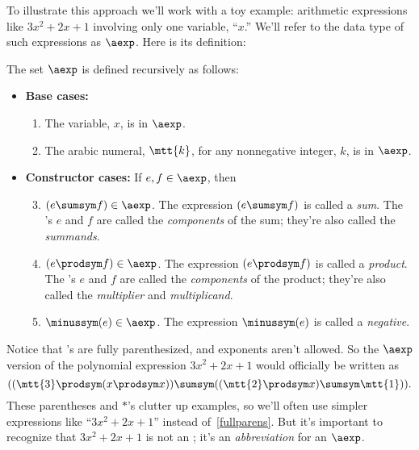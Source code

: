 To illustrate this approach we'll work with a toy example: arithmetic
expressions like $3x^2 + 2x + 1$ involving only one variable, ``$x$.''
We'll refer to the data type of such expressions as $\aexp$.  Here is its
definition:

\begin{definition}
The set $\aexp$ is defined recursively as follows:
\begin{itemize}
\item \textbf{Base cases:}

\begin{enumerate}

\item The variable, $x$, is in $\aexp$.

\item The arabic numeral, $\mtt{k}$, for any nonnegative integer, $k$, is
  in $\aexp$.

\end{enumerate}

\item \textbf{Constructor cases:} If $e,f \in \aexp$, then
\begin{enumerate}
\setcounter{enumi}{2}

\item $(e \sumsym f) \in \aexp$.  The expression $(e \sumsym f)$ is called a
  \emph{sum}.  The \aexp's $e$ and $f$ are called the \emph{components} of
  the sum; they're also called the \emph{summands}.

\item $(e \prodsym f) \in \aexp$.  The expression $(e \prodsym f)$ is called a
  \emph{product}.  The \aexp's $e$ and $f$ are called the
  \emph{components} of the product; they're also called the
  \emph{multiplier} and \emph{multiplicand}.

\item $\minussym(e) \in \aexp$.  The expression $\minussym(e)$ is called a
  \emph{negative}.
\end{enumerate}
\end{itemize}
\end{definition}

Notice that \aexp's are fully parenthesized, and exponents aren't allowed.
So the $\aexp$ version of the polynomial expression $3x^2 + 2x + 1$ would
officially be written as
\begin{equation}\label{fullparens}
((\mtt{3} \prodsym (x \prodsym x)) \sumsym ((\mtt{2} \prodsym x) \sumsym \mtt{1})).
\end{equation}
These parentheses and $\ast$'s clutter up examples, so we'll often use
simpler expressions like ``$3x^2 + 2x + 1$'' instead
of~\eqref{fullparens}.  But it's important to recognize that $3x^2 +
2x + 1$ is not an \aexp; it's an \emph{abbreviation} for an $\aexp$.

